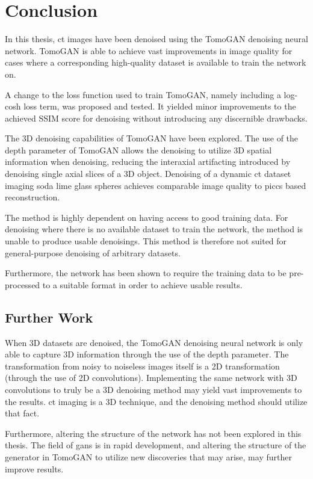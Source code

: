 \chapter{Conclusion}
\label{sec:conclusion}
In this thesis, \gls{ct} images have been denoised using the TomoGAN denoising neural network. TomoGAN is able to achieve vast improvements in image quality for cases where a corresponding high-quality dataset is available to train the network on. 

A change to the loss function used to train TomoGAN, namely including a log-cosh loss term, was proposed and tested. It yielded minor improvements to the achieved SSIM score for denoising without introducing any discernible drawbacks. 

The 3D denoising capabilities of TomoGAN have been explored. The use of the depth parameter of TomoGAN allows the denoising to utilize 3D spatial information when denoising, reducing the interaxial artifacting introduced by denoising single axial slices of a 3D object. Denoising of a dynamic \gls{ct} dataset imaging soda lime glass spheres achieves comparable image quality to \gls{piccs} based reconstruction. 

The method is highly dependent on having access to good training data. For denoising where there is no available dataset to train the network, the method is unable to produce usable denoisings. This method is therefore not suited for general-purpose denoising of arbitrary datasets.

Furthermore, the network has been shown to require the training data to be pre-processed to a suitable format in order to achieve usable results. 


\section{Further Work}
When 3D datasets are denoised, the TomoGAN denoising neural network is only able to capture 3D information through the use of the depth parameter. The transformation from noisy to noiseless images itself is a 2D transformation (through the use of 2D convolutions). Implementing the same network with 3D convolutions to truly be a 3D denoising method may yield vast improvements to the results. \Gls{ct} imaging is a 3D technique, and the denoising method should utilize that fact.

Furthermore, altering the structure of the network has not been explored in this thesis. The field of \glspl{gan} is in rapid development, and altering the structure of the generator in TomoGAN to utilize new discoveries that may arise, may further improve results. 

